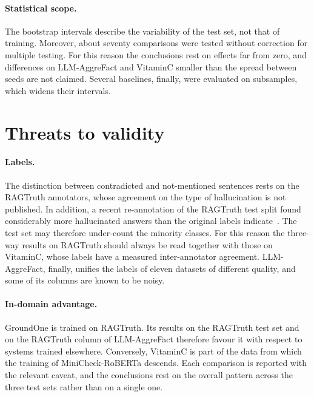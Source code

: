 \paragraph{Statistical scope.} The bootstrap intervals describe the variability of the test set, not that of training.
Moreover, about seventy comparisons were tested without correction for multiple testing. For this reason the conclusions
rest on effects far from zero, and differences on LLM-AggreFact and VitaminC smaller than the spread between seeds are
not claimed. Several baselines, finally, were evaluated on subsamples, which widens their intervals.

\section{Threats to validity}
\label{sec:disc-threats}

\paragraph{Labels.} The distinction between contradicted and not-mentioned sentences rests on the RAGTruth annotators,
whose agreement on the type of hallucination is not published. In addition, a recent re-annotation of the RAGTruth test
split found considerably more hallucinated answers than the original labels indicate~\cite{yu2026retromorphic}. The test
set may therefore under-count the minority classes. For this reason the three-way results on RAGTruth should always be
read together with those on VitaminC, whose labels have a measured inter-annotator agreement. LLM-AggreFact, finally,
unifies the labels of eleven datasets of different quality, and some of its columns are known to be noisy.

\paragraph{In-domain advantage.} GroundOne is trained on RAGTruth. Its results on the RAGTruth test set and on the
RAGTruth column of LLM-AggreFact therefore favour it with respect to systems trained elsewhere. Conversely, VitaminC is
part of the data from which the training of MiniCheck-RoBERTa descends. Each comparison is reported with the relevant
caveat, and the conclusions rest on the overall pattern across the three test sets rather than on a single one.

